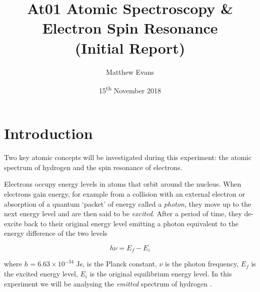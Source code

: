 \documentclass{article}
\begin{document}
\title{At01 Atomic Spectroscopy \& Electron Spin Resonance \\ \large{(Initial Report)}} %
\author{Matthew Evans}%
\date{15\textsuperscript{th} November 2018} %
\maketitle %



\section{Introduction}
\label{sec:introduction}

Two key atomic concepts will be investigated during this experiment: the atomic spectrum of hydrogen and the spin resonance of electrons. %

\vspace{2mm}
\noindent
Electrons occupy energy levels in atoms that orbit around the nucleus. When electrons gain energy, for example from a collision with an external electron or absorption of a quantum  `packet' of energy called a \textit{photon}, they move up to the next energy level and are then said to be \textit{excited}. After a  period of time, they de-excite back to their original energy level emitting a photon equivalent to the energy difference of the two levels 

\begin{equation}
\label{eq:energy-diff}
h \nu = E_f - E_i
\end{equation}

\vspace{2mm}
\noindent
where $h = 6.63 \times 10^{-34}$ Js, is the Planck constant, $\nu$ is the photon frequency, $E_f$ is the excited energy level, $E_i$ is the original equilibrium energy level. %
In this experiment we will be analysing the \textit{emitted} spectrum of hydrogen \cite{Paper01}.
\end{document}
